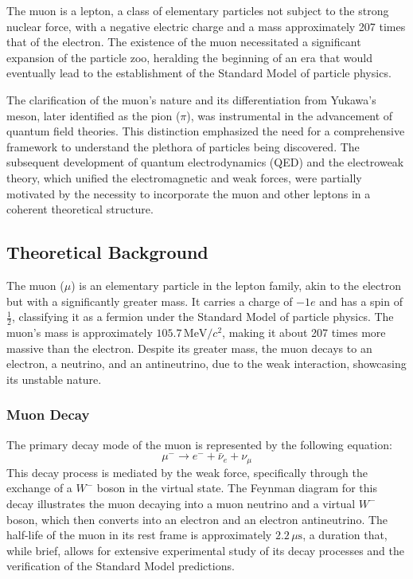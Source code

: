 \documentclass[10pt,letterpaper,onecolumn]{article}
\begin{document}
The muon is a lepton, a class of elementary particles not subject to the strong nuclear force, with a negative electric charge and a mass approximately 207 times that of the electron. \cite{CODATA2018MuonElectronMassRatio} The existence of the muon necessitated a significant expansion of the particle zoo, heralding the beginning of an era that would eventually lead to the establishment of the Standard Model of particle physics.


The clarification of the muon's nature and its differentiation from Yukawa's meson, later identified as the pion ($\pi$), was instrumental in the advancement of quantum field theories. This distinction emphasized the need for a comprehensive framework to understand the plethora of particles being discovered. The subsequent development of quantum electrodynamics (QED) and the electroweak theory, which unified the electromagnetic and weak forces, were partially motivated by the necessity to incorporate the muon and other leptons in a coherent theoretical structure. \cite{MuonG2Experiment2004}
\subsection{Theoretical Background}

The muon ($\mu$) is an elementary particle in the lepton family, akin to the electron but with a significantly greater mass. It carries a charge of $-1e$ and has a spin of $\frac{1}{2}$, classifying it as a fermion under the Standard Model of particle physics. The muon's mass is approximately $105.7 \, \text{MeV}/c^2$, making it about 207 times more massive than the electron. Despite its greater mass, the muon decays to an electron, a neutrino, and an antineutrino, due to the weak interaction, showcasing its unstable nature.

\subsubsection{Muon Decay}

The primary decay mode of the muon is represented by the following equation:
\[
\mu^- \rightarrow e^- + \bar{\nu}_e + \nu_\mu
\]
This decay process is mediated by the weak force, specifically through the exchange of a $W^-$ boson in the virtual state. The Feynman diagram for this decay illustrates the muon decaying into a muon neutrino and a virtual $W^-$ boson, which then converts into an electron and an electron antineutrino. The half-life of the muon in its rest frame is approximately $2.2 \, \mu\text{s}$, a duration that, while brief, allows for extensive experimental study of its decay processes and the verification of the Standard Model predictions. \cite{Beringer2012Leptons}
\end{document}
